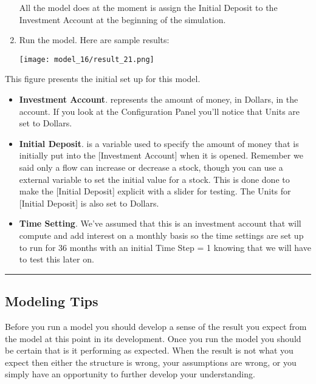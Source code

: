 \documentclass[]{memoir}
\makeatletter
\def\maxwidth{\ifdim\Gin@nat@width>\linewidth\linewidth
\else\Gin@nat@width\fi}
\let\Oldincludegraphics\includegraphics
\renewcommand{\includegraphics}[1]{\Oldincludegraphics[width=\maxwidth]{#1}}
\makeatother
\begin{document}
\begin{oframed}
\begin{enumerate}
All the model does at the moment is assign the Initial Deposit to the Investment Account at the beginning of the simulation.


\item Run the model. Here are sample results:\par \begin{minipage}{\linewidth}  \centering \texttt{[image: model\_16/result\_21.png]}
\end{minipage}

\end{enumerate} \end{oframed}

This figure presents the initial set up for this model.

\begin{itemize}
\itemsep1pt\parskip0pt
\item
  \textbf{Investment Account}. represents the amount of money, in
  Dollars, in the account. If you look at the Configuration Panel you'll
  notice that Units are set to Dollars.
\item
  \textbf{Initial Deposit}. is a variable used to specify the amount of
  money that is initially put into the {[}Investment Account{]} when it
  is opened. Remember we said only a flow can increase or decrease a
  stock, though you can use a external variable to set the initial value
  for a stock. This is done done to make the {[}Initial Deposit{]}
  explicit with a slider for testing. The Units for {[}Initial
  Deposit{]} is also set to Dollars.
\item
  \textbf{Time Setting}. We've assumed that this is an investment
  account that will compute and add interest on a monthly basis so the
  time settings are set up to run for 36 months with an initial Time
  Step = 1 knowing that we will have to test this later on.
\end{itemize}

\begin{center}\rule{3in}{0.4pt}\end{center}

\subsection{Modeling Tips}

Before you run a model you should develop a sense of the result you
expect from the model at this point in its development. Once you run the
model you should be certain that is it performing as expected. When the
result is not what you expect then either the structure is wrong, your
assumptions are wrong, or you simply have an opportunity to further
develop your understanding.
\end{document}
